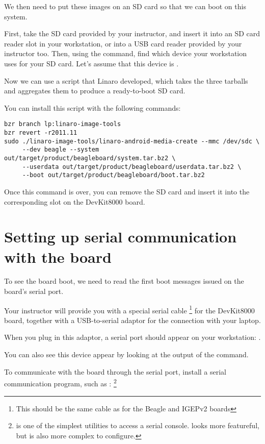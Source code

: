 We then need to put these images on an SD card so that we can boot on
this system.

First, take the SD card provided by your instructor, and insert it
into an SD card reader slot in your workstation, or into a USB card
reader provided by your instructor too. Then, using the 
command, find which device your workstation uses for your SD card.
Let's assume that this device is .

Now we can use a  script that Linaro
developed, which takes the three tarballs and aggregates them to
produce a ready-to-boot SD card.

You can install this script with the following commands:

\begin{verbatim}
bzr branch lp:linaro-image-tools
bzr revert -r2011.11
sudo ./linaro-image-tools/linaro-android-media-create --mmc /dev/sdc \
     --dev beagle --system out/target/product/beagleboard/system.tar.bz2 \
     --userdata out/target/product/beagleboard/userdata.tar.bz2 \
     --boot out/target/product/beagleboard/boot.tar.bz2
\end{verbatim}

Once this command is over, you can remove the SD card and insert it
into the corresponding slot on the DevKit8000 board.

\section{Setting up serial communication with the board}

To see the board boot, we need to read the first boot messages issued
on the board's serial port.

Your instructor will provide you with a special serial cable
\footnote{This should be the same cable as for the Beagle and IGEPv2
  boards} for the DevKit8000 board, together with a USB-to-serial
adaptor for the connection with your laptop.

When you plug in this adaptor, a serial port should appear on your
workstation: \code{/dev/ttyUSB0}.

You can also see this device appear by looking at the output of the
\code{dmesg} command.

To communicate with the board through the serial port, install a
serial communication program, such as :
\footnote{ is one of the simplest utilities to access a
  serial console. \code{minicom} looks more featureful, but is also
  more complex to configure.}

